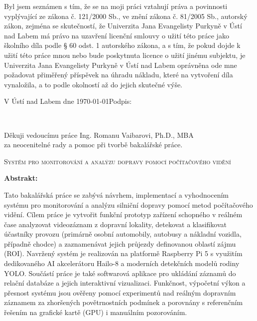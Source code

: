\documentclass[male,czech,api_bc]{kitheses}
\newcommand{\nazevcz}{Systém pro monitorování a analýzu dopravy pomocí počítačového vidění}
\newcommand{\vedouciDAT}{Ing. Romanu Vaibarovi, Ph.D., MBA}
\begin{document}
\vspace{0.5em}

Byl jsem seznámen 
s tím, že se na moji práci vztahují práva a povinnosti vyplývající ze
zákona č. 121/2000 Sb., ve znění zákona č. 81/2005 Sb., autorský zákon, zejména se
skutečností, že Univerzita Jana Evangelisty Purkyně v Ústí nad Labem má právo na uzavření
licenční smlouvy o užití této práce jako školního díla podle § 60 odst. 1 autorského zákona, a
s tím, že pokud dojde k užití této práce mnou nebo bude poskytnuta licence o užití jinému
subjektu, je Univerzita Jana Evangelisty Purkyně v Ústí nad Labem oprávněna ode mne
požadovat přiměřený příspěvek na úhradu nákladu, které na vytvoření díla vynaložila, a to
podle okolností až do jejich skutečné výše.

\vspace{2em}

V Ústí nad Labem dne \today   \hfill Podpis: \makebox[4cm][s]{\dotfill}

\cleardoublepage
\thispagestyle{empty}
~
\vfill

\begin{flushright}
    Děkuji vedoucímu práce {\vedouciDAT}\\ 
    za neocenitelné rady a pomoc při tvorbě bakalářské práce.
\end{flushright}

\cleardoublepage

\textsc{\nazevcz}

\textbf{Abstrakt:}

Tato bakalářská práce se zabývá návrhem, implementací a vyhodnocením systému pro monitorování a analýzu silniční dopravy pomocí metod počítačového vidění. Cílem práce je vytvořit funkční prototyp zařízení schopného v reálném čase analyzovat videozáznam z dopravní lokality, detekovat a klasifikovat účastníky provozu (primárně osobní automobily, autobusy a nákladní vozidla, případně chodce) a zaznamenávat jejich průjezdy definovanou oblastí zájmu (ROI). Navržený systém je realizován na platformě Raspberry Pi 5 s využitím dedikovaného AI akcelerátoru Hailo-8 a moderních detekčních modelů rodiny YOLO. Součástí práce je také softwarová aplikace pro ukládání záznamů do relační databáze a jejich interaktivní vizualizaci. Funkčnost, výpočetní výkon a přesnost systému jsou ověřeny pomocí experimentů nad reálným dopravním záznamem za zhoršených povětrnostních podmínek a porovnány s referenčním řešením na grafické kartě (GPU) i manuálním pozorováním.
\end{document}
